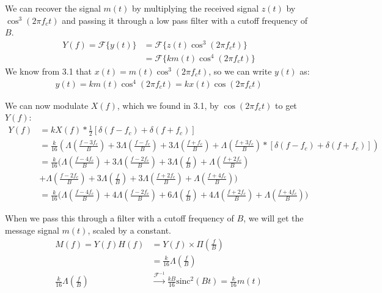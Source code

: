 \documentclass{article}
\begin{document}
\begin{enumerate}[label=3.\arabic*]
\begin{center}
    \end{center}

    We can recover the signal $m(t)$ by multiplying the received signal $z(t)$ by $\cos^3(2\pi f_c t)$ and passing it through a low pass filter with a cutoff frequency of $B$.
    \begin{align*}  
        Y(f) = \mathcal{F}\{y(t)\} &= \mathcal{F}\{z(t) \cos^3(2\pi f_c t)\} \\
        &= \mathcal{F}\{k m(t) \cos^4(2\pi f_c t)\}
    \end{align*}
    We know from 3.1 that $x(t) = m(t) \cos^3(2\pi f_c t)$, so we can write $y(t)$ as:
    \begin{align*}
        y(t) = k m(t) \cos^4(2\pi f_c t) = k x(t) \cos(2\pi f_c t)
    \end{align*}

    We can now modulate $X(f)$, which we found in 3.1, by $\cos(2\pi f_c t)$ to get $Y(f)$:
    \begin{align*}
        Y(f) &= kX(f) * \frac{1}{2} \left[\delta(f-f_c) + \delta(f+f_c)\right] \\
        &= \frac{k}{16} \left(
            \Lambda\left(\frac{f-3f_c}{B}\right) + 3\Lambda\left(\frac{f-f_c}{B}\right) + 3\Lambda\left(\frac{f+f_c}{B}\right) + \Lambda\left(\frac{f+3f_c}{B}\right) \ast \left[\delta(f-f_c) + \delta(f+f_c)\right]
        \right) \\ 
        &= \frac{k}{16}\Bigg(\Lambda\left(\frac{f-4f_c}{B}\right) + 3\Lambda\left(\frac{f-2f_c}{B}\right) + 3\Lambda\left(\frac{f}{B}\right) + \Lambda\left(\frac{f+2f_c}{B}\right) \\
            &+ \Lambda\left(\frac{f-2f_c}{B}\right) + 3\Lambda\left(\frac{f}{B}\right) + 3\Lambda\left(\frac{f+2f_c}{B}\right) + \Lambda\left(\frac{f+4f_c}{B}\right) \Bigg) \\
        &= \frac{k}{16}\Bigg(\Lambda\left(\frac{f-4f_c}{B}\right) + 4\Lambda\left(\frac{f-2f_c}{B}\right) + 6\Lambda\left(\frac{f}{B}\right) + 4\Lambda\left(\frac{f+2f_c}{B}\right) + \Lambda\left(\frac{f+4f_c}{B}\right) \Bigg)
    \end{align*}

    When we pass this through a filter with a cutoff frequency of $B$, we will get the message signal $m(t)$, scaled by a constant.
    \begin{align*}
        M(f) = Y(f)H(f) &= Y(f) \times \Pi\left(\frac{f}{B}\right) \\
        &= \frac{k}{16}\Lambda\left(\frac{f}{B}\right) \\
        \frac{k}{16}\Lambda\left(\frac{f}{B}\right) &\xrightarrow{\mathcal{F}^{-1}} \frac{kB}{16} \text{sinc}^2\left(Bt\right) = \frac{k}{16} m(t)
    \end{align*}
\end{enumerate}

\end{document}
